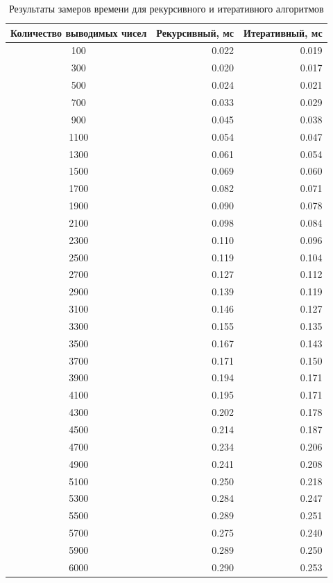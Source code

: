 \begin{table}[H]
	\centering
	\begin{threeparttable}
		\caption{Результаты замеров времени для рекурсивного и итеративного алгоритмов}
		\label{tab:csv}
		\begin{tabular}{|c|r|r|}
			\hline
			\textbf{Количество выводимых чисел} & \textbf{Рекурсивный, мс} & \textbf{Итеративный, мс} \\
			\hline
			100 & 0.022 & 0.019 \\
			\hline
			300 & 0.020 & 0.017 \\
			\hline
			500 & 0.024 & 0.021 \\
			\hline
			700 & 0.033 & 0.029 \\
			\hline
			900 & 0.045 & 0.038 \\
			\hline
			1100 & 0.054 & 0.047 \\
			\hline
			1300 & 0.061 & 0.054 \\
			\hline
			1500 & 0.069 & 0.060 \\
			\hline
			1700 & 0.082 & 0.071 \\
			\hline
			1900 & 0.090 & 0.078 \\
			\hline
			2100 & 0.098 & 0.084 \\
			\hline
			2300 & 0.110 & 0.096 \\
			\hline
			2500 & 0.119 & 0.104 \\
			\hline
			2700 & 0.127 & 0.112 \\
			\hline
			2900 & 0.139 & 0.119 \\
			\hline
			3100 & 0.146 & 0.127 \\
			\hline
			3300 & 0.155 & 0.135 \\
			\hline
			3500 & 0.167 & 0.143 \\
			\hline
			3700 & 0.171 & 0.150 \\
			\hline
			3900 & 0.194 & 0.171 \\
			\hline
			4100 & 0.195 & 0.171 \\
			\hline
			4300 & 0.202 & 0.178 \\
			\hline
			4500 & 0.214 & 0.187 \\
			\hline
			4700 & 0.234 & 0.206 \\
			\hline
			4900 & 0.241 & 0.208 \\
			\hline
			5100 & 0.250 & 0.218 \\
			\hline
			5300 & 0.284 & 0.247 \\
			\hline
			5500 & 0.289 & 0.251 \\
			\hline
			5700 & 0.275 & 0.240 \\
			\hline
			5900 & 0.289 & 0.250 \\
			\hline
			6000 & 0.290 & 0.253 \\
			\hline
		\end{tabular}
	\end{threeparttable}
\end{table}


